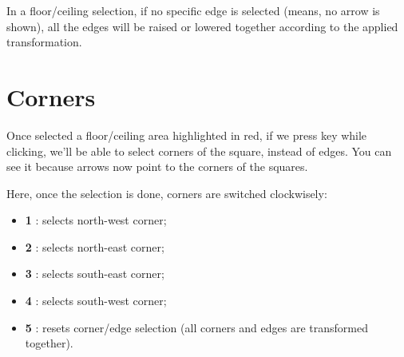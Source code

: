 \begin{remark}
    In a floor/ceiling selection, if no specific edge is selected (means, no arrow is shown), all the edges will be raised or lowered together according to the applied transformation.
\end{remark}

\section{Corners}

Once selected a floor/ceiling area highlighted in red, if we press  key while clicking, we'll be able to select corners of the square, instead of edges. You can see it because arrows now point to the corners of the squares.
\par Here, once the selection is done, corners are switched clockwisely:
\begin{itemize}
    \item \textbf{1 }: selects north-west corner;
    \item \textbf{2 }: selects north-east corner;
    \item \textbf{3 }: selects south-east corner;
    \item \textbf{4 }: selects south-west corner;
    \item \textbf{5 }: resets corner/edge selection (all corners and edges are transformed together).
\end{itemize}
